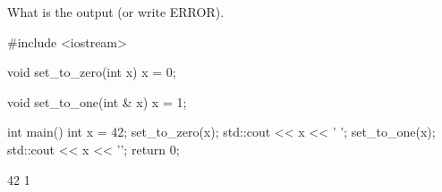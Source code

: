 \nextq
What is the output (or write ERROR).
\begin{console}[fontsize=\footnotesize]
#include <iostream>

void set_to_zero(int x)
{
    x = 0;
}

void set_to_one(int & x)
{
    x = 1;
}

int main()
{
    int x = 42;
    set_to_zero(x);
    std::cout << x << ' ';
    set_to_one(x);
    std::cout << x << '\n';
    return 0;
}
\end{console}
\ANSWER
\begin{answercode}
42 1
\end{answercode}


